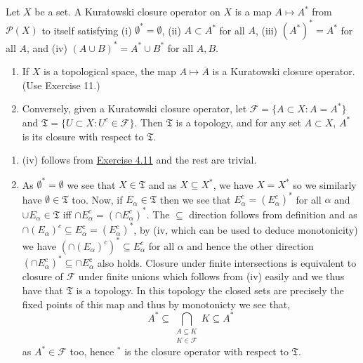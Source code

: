 \documentclass[12pt,a4paper]{article}
\begin{document}
\begin{problem}\label{prob:4-12}
Let $X$ be a set. A Kuratowski closure operator on $X$ is a map $A \mapsto A^*$ from $\mathcal{P}(X)$ to itself satisfying (i) $\emptyset^* = \emptyset$, (ii) $A \subset A^*$ for all $A$, (iii) $(A^*)^* = A^*$ for all $A$, and (iv) $(A \cup B)^* = A^* \cup B^*$ for all $A, B$.
\begin{enumerate}[label=\alph*.]
    \item If $X$ is a topological space, the map $A \mapsto \overline{A}$ is a Kuratowski closure operator. (Use Exercise 11.)
    \item Conversely, given a Kuratowski closure operator, let $\mathcal{F} = \{A \subset X : A = A^*\}$ and $\mathfrak{T} = \{U \subset X : U^c \in \mathcal{F}\}$. Then $\mathfrak{T}$ is a topology, and for any set $A \subset X$, $A^*$ is its closure with respect to $\mathfrak{T}$.
\end{enumerate}
\end{problem}
\begin{solution}
\begin{enumerate}[label=\alph*.]
    \item (iv) follows from \hyperref[prob:4-11]{Exercise 4.11} and the rest are trivial. 
    \item As $\emptyset^*=\emptyset$ we see that $X\in\mathfrak T$ and as $X\subseteq X^*$, we have $X=X^*$ so we similarly have $\emptyset\in\mathfrak T$ too. 
        Now, if $E_\alpha\in\mathfrak T$ then we see that $E_\alpha^c=(E_\alpha^c)^*$ for all $\alpha$ and $\cup E_\alpha\in\mathfrak T$ iff $\cap E_\alpha^c=(\cap E_\alpha^c)^*$. 
        The $\subseteq$ direction follows from definition and as $\cap (E_\alpha)^c\subseteq E_\alpha^c=(E_\alpha^c)^*$, by (iv, which can be used to deduce monotonicity) we have $(\cap (E_\alpha)^c)^*\subseteq E_\alpha^c$ for all $\alpha$ and hence the other direction $(\cap E_\alpha^c)^*\subseteq\cap E_\alpha^c$ also holds. 
        Closure under finite intersections is equivalent to closure of $\mathcal F$ under finite unions which follows from (iv) easily and we thus have that $\mathfrak T$ is a topology. 
        In this topology the closed sets are precisely the fixed points of this map and thus by monotonicty we see that,
        \[
            A^*\subseteq\bigcap_{\substack{A\subseteq K\\ K\in\mathcal F}}K\subseteq A^*
        \]
        as $A^*\in\mathcal F$ too, hence $^*$ is the closure operator with respect to $\mathfrak T.$ 
\end{enumerate}
\end{solution}
\end{document}
